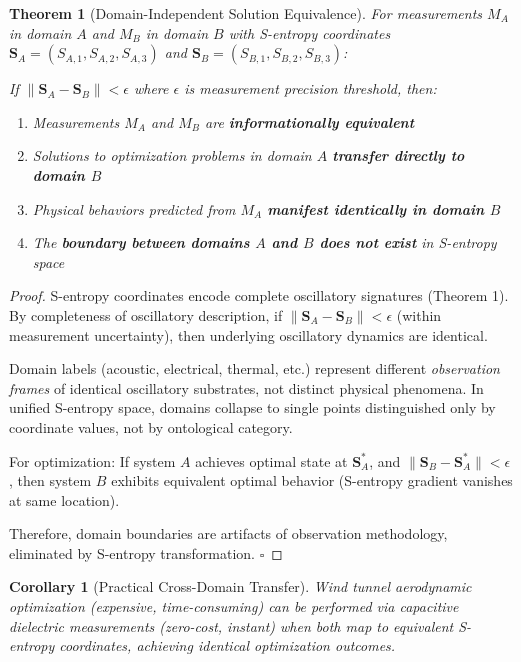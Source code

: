 \documentclass[12pt,a4paper]{article}
\newtheorem{theorem}{Theorem}
\newtheorem{corollary}{Corollary}
\begin{document}
\begin{theorem}[Domain-Independent Solution Equivalence]
For measurements $M_A$ in domain $A$ and $M_B$ in domain $B$ with S-entropy coordinates $\mathbf{S}_A = (S_{A,1}, S_{A,2}, S_{A,3})$ and $\mathbf{S}_B = (S_{B,1}, S_{B,2}, S_{B,3})$:

If $\|\mathbf{S}_A - \mathbf{S}_B\| < \epsilon$ where $\epsilon$ is measurement precision threshold, then:
\begin{enumerate}
\item Measurements $M_A$ and $M_B$ are \textbf{informationally equivalent}
\item Solutions to optimization problems in domain $A$ \textbf{transfer directly to domain $B$}
\item Physical behaviors predicted from $M_A$ \textbf{manifest identically in domain $B$}
\item The \textbf{boundary between domains $A$ and $B$ does not exist} in S-entropy space
\end{enumerate}
\end{theorem}

\begin{proof}
S-entropy coordinates encode complete oscillatory signatures (Theorem 1). By completeness of oscillatory description, if $\|\mathbf{S}_A - \mathbf{S}_B\| < \epsilon$ (within measurement uncertainty), then underlying oscillatory dynamics are identical.

Domain labels (acoustic, electrical, thermal, etc.) represent different \textit{observation frames} of identical oscillatory substrates, not distinct physical phenomena. In unified S-entropy space, domains collapse to single points distinguished only by coordinate values, not by ontological category.

For optimization: If system $A$ achieves optimal state at $\mathbf{S}_A^*$, and $\|\mathbf{S}_B - \mathbf{S}_A^*\| < \epsilon$, then system $B$ exhibits equivalent optimal behavior (S-entropy gradient vanishes at same location).

Therefore, domain boundaries are artifacts of observation methodology, eliminated by S-entropy transformation. $\square$
\end{proof}

\begin{corollary}[Practical Cross-Domain Transfer]
Wind tunnel aerodynamic optimization (expensive, time-consuming) can be performed via capacitive dielectric measurements (zero-cost, instant) when both map to equivalent S-entropy coordinates, achieving identical optimization outcomes.
\end{corollary}
\end{document}
